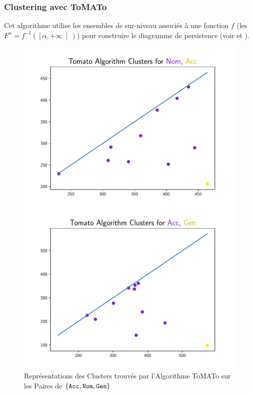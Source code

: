 \documentclass[noamsthm]{beamercours}
\begin{document}
\begin{frame}
\frametitle{Clustering avec ToMATo}\label{subsub:tomato}
Cet algorithme utilise les ensembles de sur-niveau associés à une fonction $f$ (les $F^{\alpha} = f^{-1}\left(\left[\alpha, +\infty\right[\right)$) pour construire le diagramme de persistence (voir \cite{tldrtda} et \cite{ToMATo}).

\begin{figure}
\begin{minipage}{.45\textwidth}
	\includegraphics[width=\linewidth]{Figures/Visualisations/tomato_Nom_Acc_Nouns}
\end{minipage}
\begin{minipage}{.45\textwidth}
	\includegraphics[width=\linewidth]{Figures/Visualisations/tomato_Acc_Gen_Nouns}
\end{minipage}
\caption{Représentations des Clusters trouvés par l'Algorithme ToMATo sur les Paires de $\{\tt Acc,Nom,Gen\}$}
\label{fig_tomato}
\end{figure}
\end{frame}
\end{document}
